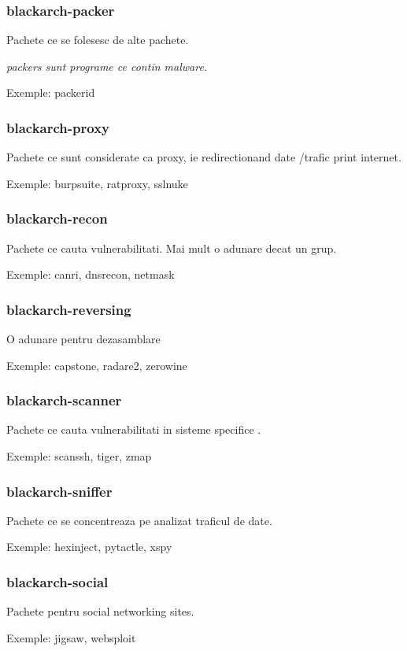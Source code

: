 \documentclass[a4paper, oneside, 11pt]{book}
\begin{document}
\subsubsection{blackarch-packer}
Pachete ce se folesesc de alte pachete.

\textit{packers sunt programe ce contin malware.}

Exemple: packerid

\subsubsection{blackarch-proxy}
Pachete ce sunt considerate ca proxy, ie redirectionand date /trafic
print internet.

Exemple: burpsuite, ratproxy, sslnuke

\subsubsection{blackarch-recon}
Pachete ce cauta vulnerabilitati. Mai mult o adunare decat un grup.

Exemple: canri, dnsrecon, netmask

\subsubsection{blackarch-reversing}
O adunare pentru dezasamblare

Exemple: capstone, radare2, zerowine

\subsubsection{blackarch-scanner}
Pachete ce cauta vulnerabilitati in sisteme specifice .

Exemple: scanssh, tiger, zmap

\subsubsection{blackarch-sniffer}
Pachete ce se concentreaza pe analizat traficul de date.

Exemple: hexinject, pytactle, xspy

\subsubsection{blackarch-social}
Pachete pentru social networking sites.

Exemple: jigsaw, websploit
\end{document}
